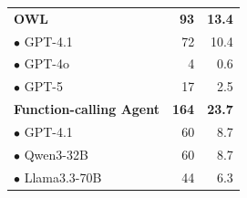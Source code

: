 \begin{table}[ht]
{\begin{tabular}{lrr}
            \hspace{0.3cm} \textbf{OWL} &  \textbf{93} & \textbf{13.4} \\ 
                \hspace{0.6cm} \hspace{0.3cm} $\bullet$ GPT-4.1 & 72 & 10.4 \\ 
                \hspace{0.6cm} \hspace{0.3cm} $\bullet$ GPT-4o &  4 & 0.6 \\ 
                \hspace{0.6cm} \hspace{0.3cm} $\bullet$ GPT-5 &  17 & 2.5 \\ 
            \rowcolor{COLOR_MEAN} 
            \hspace{0.3cm} \textbf{Function-calling Agent} &  \textbf{164} & \textbf{23.7} \\ 
                \hspace{0.6cm} \hspace{0.3cm} $\bullet$ GPT-4.1 &  60 & 8.7 \\ 
                \hspace{0.6cm} \hspace{0.3cm} $\bullet$ Qwen3-32B &  60 & 8.7 \\ 
                \hspace{0.6cm} \hspace{0.3cm} $\bullet$ Llama3.3-70B &  44 & 6.3 \\
            \bottomrule
        \end{tabular}
    }
\end{table}

















